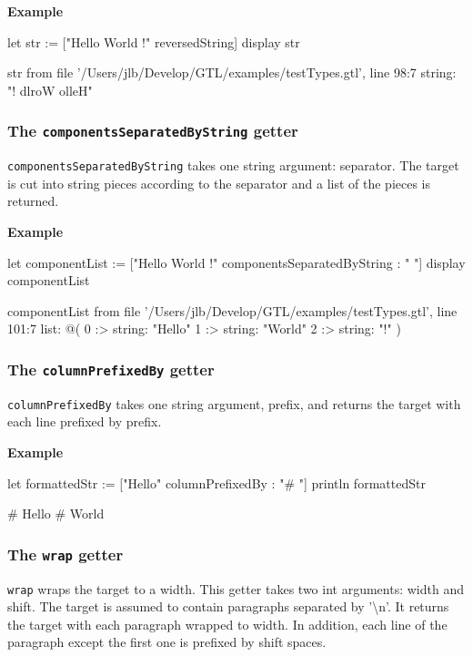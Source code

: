 \documentclass[10pt,openright,twosides,final]{memoir}
\newcommand{\ccst}[1]{{\footnotesize\ttfamily\colorbox{light-blue}{'#1'}}}
\newcommand{\gtlarg}[1]{{\footnotesize\ttfamily\colorbox{light-blue}{#1}}}
\newcommand{\gtlinline}[1]{\colorbox{light-blue}{\lstinline[language=gtl]{#1}}}
\newcommand{\example}{\vspace{.75em}\noindent\textbf{Example}\vspace{0em}}
\begin{document}
\example
\begin{gtl}
let str := ["Hello World !" reversedString]
display str
\end{gtl}
\begin{console}
str from file '/Users/jlb/Develop/GTL/examples/testTypes.gtl', line 98:7
    string: "! dlroW olleH"
\end{console}

\subsubsection{The \texttt{componentsSeparatedByString} getter}

\gtlinline{componentsSeparatedByString} takes one string argument: \gtlarg{separator}. The target is cut into string pieces according to the \gtlarg{separator} and a list of the pieces is returned.\

\example
\begin{gtl}
let componentList := ["Hello World !" componentsSeparatedByString : " "]
display componentList
\end{gtl}
\begin{console}
componentList from file '/Users/jlb/Develop/GTL/examples/testTypes.gtl', line 101:7
    list: @(
        0 :>
            string: "Hello"
        1 :>
            string: "World"
        2 :>
            string: "!"
    )
\end{console}

\subsubsection{The \texttt{columnPrefixedBy} getter}

\gtlinline{columnPrefixedBy} takes one string argument, \gtlarg{prefix}, and returns the target with each line prefixed by \gtlarg{prefix}.

\example
\begin{gtl}
let formattedStr := ["Hello\nWorld" columnPrefixedBy : "# "]
println formattedStr
\end{gtl}
\begin{console}
# Hello
# World
\end{console}

\subsubsection{The \texttt{wrap} getter}

\gtlinline{wrap} wraps the target to a width. This getter takes two int arguments: \gtlarg{width} and \gtlarg{shift}. The target is assumed to contain paragraphs separated by \ccst{\textbackslash n}. It returns the target with each paragraph wrapped to \gtlarg{width}. In addition, each line of the paragraph except the first one is prefixed by \gtlarg{shift} spaces.
\end{document}

